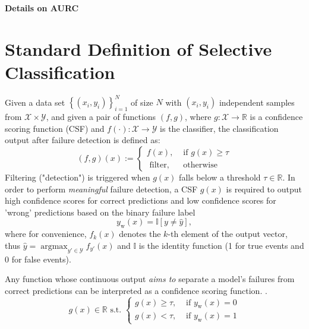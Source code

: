 \begin{center}{\noindent\Large\bf Details on AURC}\end{center}

\section{Standard Definition of Selective Classification} %

Given a data set $\left\{\left(x_i, y_i\right)\right\}_{i=1}^N$ of size $N$ with $\left(x_i, y_i\right)$ independent samples from $\mathcal{X} \times \mathcal{Y}$, and given a pair of functions $(f, g)$, where $g: \mathcal{X} \rightarrow \mathbb{R}$ is a confidence scoring function (CSF) and $f(\cdot): \mathcal{X} \rightarrow \mathcal{Y}$ is the classifier, the classification output after failure detection is defined as:
$$
    (f, g)(x):=\left\{\begin{array}{ll}
        f\left(x\right),  & \text { if } g(x) \geq \tau \\
        \text { filter, } & \text { otherwise }
    \end{array}\right.
$$
Filtering ("detection") is triggered when $g(x)$ falls below a threshold $\tau \in \mathbb{R}$.
In order to perform \textit{meaningful} failure detection, a CSF $g(x)$ is required to output high confidence scores for correct predictions and low confidence scores for 'wrong' predictions based on the binary failure label
$$
    y_{\mathrm{w}}(x)=\mathbb{I}\left[y \neq \hat{y}\right],
$$
where for convenience, $f_{k}(x)$ denotes the $k$-th element of the output vector, thus $\hat{y}=\operatorname{argmax}_{y' \in \mathcal{Y}} f_{y'}(x)$ and $\mathbb{I}$ is the identity function (1 for true events and 0 for false events).


\begin{definition}
    Any function whose continuous output \textit{aims to} separate a model's failures from correct predictions can be interpreted as a confidence scoring function. \cite{jaeger2023a}.
    \begin{equation}
        g(x) \in \mathbb{R} \text { s.t. } \left\{\begin{array}{ll}
            g(x) \geq \tau, & \text { if } y_{\mathrm{w}}(x)=0 \\
            g(x) < \tau,    & \text { if } y_{\mathrm{w}}(x)=1
        \end{array}\right.
    \end{equation}
\end{definition}

